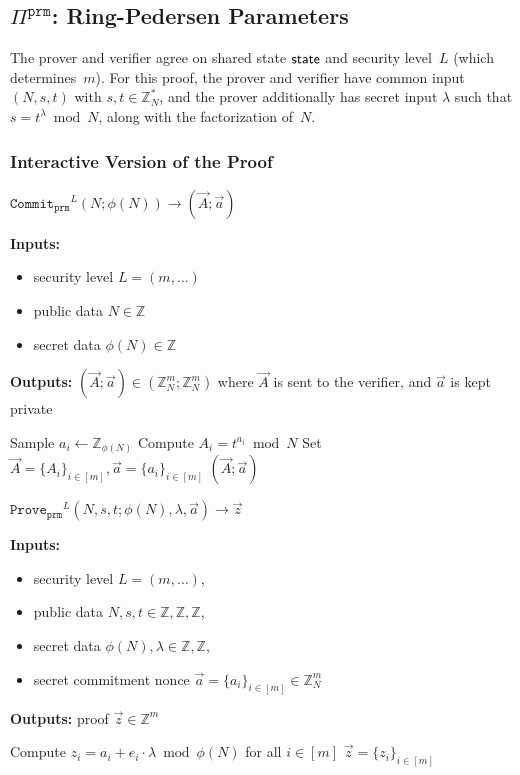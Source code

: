 \documentclass[11pt]{article}
\newenvironment{inlineAlgorithm}{}{}
\newcommand{\algoName}[1]{#1 \par}
\newcommand{\algoInputsList}[1]{
    {\small \bf Inputs:} 
        \begin{itemize}[noitemsep,topsep=0pt]
            #1
        \end{itemize}
}
\newcommand{\algoOutputs}[1]{
    {\small \bf Outputs:} #1 \par
}
\def\state{{\sf state}}
\newcommand{\proof}[1]{\ensuremath{\Pi^{\mathtt{#1}}}}
\newcommand{\commit}[1]{\ensuremath{\mathtt{Commit}_{\mathtt{#1}}}}
\newcommand{\prove}[1]{\ensuremath{\mathtt{Prove}_{\mathtt{#1}}}}
\newcommand{\Z}{\mathbb{Z}}
\newcommand{\?}[1]{\stackrel{?}{#1}}
\begin{document}
\subsection{$\proof{prm}$: Ring-Pedersen Parameters}
The prover and verifier agree on shared state $\state$ and security level~$L$ (which determines~$m$). 
For this proof, the prover and verifier have common input $(N, s, t)$ with $s, t \in {\mathbb Z}_N^*$, and the prover additionally has secret input $\lambda$ such that $s=t^\lambda \bmod N$, along with the factorization of~$N$.

\subsubsection{Interactive Version of the Proof}

\begin{description}

\item
\begin{inlineAlgorithm}
\algoName{$\commit{prm}^L(N; \phi(N)) \to (\vec A; \vec a)$}
\algoInputsList{
    \item security level $L = (m, \dots)$
    \item public data $N \in \Z$
    \item secret data $\phi(N) \in \Z$
}
\algoOutputs{$(\vec A; \vec a) \in (\Z_N^m; \Z_N^m)$
        where $\vec A$ is sent to the verifier, and $\vec a$ is kept private}
\begin{algorithmic}[1]
    \State Sample $a_i \gets \Z_{\phi(N)}$
    \State Compute $A_i = t^{a_i} \bmod N$
\EndFor
\State Set $\vec A = \{A_i\}_{i\in[m]}, \vec a = \{a_i\}_{i\in[m]}$
\State \Return $(\vec A; \vec a)$
\end{algorithmic}
\end{inlineAlgorithm}

\item
\begin{inlineAlgorithm}
\algoName{$\prove{prm}^L(N, s, t; \phi(N), \lambda, \vec a) \to \vec z$}
\algoInputsList{
    \item security level $L = (m, \dots)$,
    \item public data $N, s, t \in \Z, \Z, \Z$,
    \item secret data $\phi(N), \lambda \in \Z, \Z$,
    \item secret commitment nonce $\vec a = \{a_i\}_{i\in[m]} \in \Z_N^m$
}
\algoOutputs{proof $\vec z \in \Z^m$}
\begin{algorithmic}[1]
\State Compute $z_i = a_i + e_i \cdot \lambda \bmod \phi(N)$ for all $i \in [m]$
\State \Return $\vec z = \{z_i\}_{i\in[m]}$
\end{algorithmic}
\end{inlineAlgorithm}


\end{description}
\end{document}
